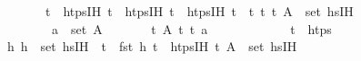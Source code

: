 \begin{isabellebody}
\ \ \ \ \ \ \ {\isachardoublequoteopen}t{\isacharprime}{\kern0pt}{\isacharprime}{\kern0pt}\ {\isasymnotin}\ htps{\isacharunderscore}{\kern0pt}IH{\isachardoublequoteclose}\ {\isachardoublequoteopen}t\ {\isasymin}\ htps{\isacharunderscore}{\kern0pt}IH{\isachardoublequoteclose}\ {\isachardoublequoteopen}t\ {\isasymin}\ htps{\isacharunderscore}{\kern0pt}IH{\isachardoublequoteclose}\ {\isachardoublequoteopen}t{\isacharprime}{\kern0pt}{\isacharprime}{\kern0pt}\ {\isasymin}\ {\isacharbraceleft}{\kern0pt}t\ t\ {\isachardoublequoteopen}{\isacharparenleft}{\kern0pt}t{\isacharprime}{\kern0pt}{\isacharprime}{\kern0pt}{\isacharcomma}{\kern0pt}\ A{\isacharprime}{\kern0pt}{\isacharprime}{\kern0pt}{\isacharparenright}{\kern0pt}\ {\isasymin}\ set\ hs{\isacharprime}{\kern0pt}{\isacharunderscore}{\kern0pt}IH{\isachardoublequoteclose}\isanewline
\ \ \ \ \ \ \ \ {\isachardoublequoteopen}a\ {\isasymin}\ set\ A{\isacharprime}{\kern0pt}{\isacharprime}{\kern0pt}{\isachardoublequoteclose}\isanewline
\ \ \ \ \ \ \ t{\isacharprime}{\kern0pt}{\isacharprime}{\kern0pt}\ A{\isacharprime}{\kern0pt}{\isacharprime}{\kern0pt}\ t\ t\ a\isanewline
\ \ \ \ \isamarkupfalse%
{\isacharminus}{\kern0pt}\isanewline
\ \ \ \ \ \ \isamarkupfalse%
\ {\isachardoublequoteopen}t{\isacharprime}{\kern0pt}{\isacharprime}{\kern0pt}\ {\isasymnotin}\ htps{\isachardoublequoteclose}\isanewline
\ \ \ \ \ \ \ \ \isamarkupfalse%
\ {\isacartoucheopen}{\isasymAnd}h{\isacharprime}{\kern0pt}{\isachardot}{\kern0pt}\ h{\isacharprime}{\kern0pt}\ {\isasymin}\ set\ {\isacharparenleft}{\kern0pt}hs{\isacharprime}{\kern0pt}{\isacharunderscore}{\kern0pt}IH{\isacharparenright}{\kern0pt}\ {\isasymLongrightarrow}\ t{\isacharprime}{\kern0pt}\ {\isasymnoteq}\ fst\ h{\isacharprime}{\kern0pt}{\isacartoucheclose}\ {\isacartoucheopen}t{\isacharprime}{\kern0pt}{\isacharprime}{\kern0pt}\ {\isasymnotin}\ htps{\isacharunderscore}{\kern0pt}IH{\isacartoucheclose}\ {\isacartoucheopen}{\isacharparenleft}{\kern0pt}t{\isacharprime}{\kern0pt}{\isacharprime}{\kern0pt}{\isacharcomma}{\kern0pt}\ A{\isacharprime}{\kern0pt}{\isacharprime}{\kern0pt}{\isacharparenright}{\kern0pt}\ {\isasymin}\ set\ hs{\isacharprime}{\kern0pt}{\isacharunderscore}{\kern0pt}IH{\isacartoucheclose}\isanewline

\end{isabellebody}
